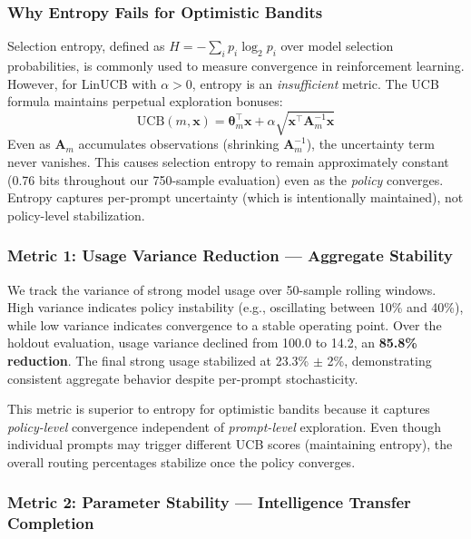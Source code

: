 \subsubsection{Why Entropy Fails for Optimistic Bandits}

Selection entropy, defined as $H = -\sum_i p_i \log_2 p_i$ over model selection probabilities, is commonly used to measure convergence in reinforcement learning. However, for LinUCB with $\alpha > 0$, entropy is an \emph{insufficient} metric. The UCB formula maintains perpetual exploration bonuses:
\begin{equation}
\text{UCB}(m, \mathbf{x}) = \boldsymbol{\theta}_m^\top \mathbf{x} + \alpha \sqrt{\mathbf{x}^\top \mathbf{A}_m^{-1} \mathbf{x}}
\end{equation}
Even as $\mathbf{A}_m$ accumulates observations (shrinking $\mathbf{A}_m^{-1}$), the uncertainty term never vanishes. This causes selection entropy to remain approximately constant (0.76 bits throughout our 750-sample evaluation) even as the \emph{policy} converges. Entropy captures per-prompt uncertainty (which is intentionally maintained), not policy-level stabilization.

\subsubsection{Metric 1: Usage Variance Reduction — Aggregate Stability}

We track the variance of strong model usage over 50-sample rolling windows. High variance indicates policy instability (e.g., oscillating between 10\% and 40\%), while low variance indicates convergence to a stable operating point. Over the holdout evaluation, usage variance declined from 100.0 to 14.2, an \textbf{85.8\% reduction}. The final strong usage stabilized at 23.3\% $\pm$ 2\%, demonstrating consistent aggregate behavior despite per-prompt stochasticity.

This metric is superior to entropy for optimistic bandits because it captures \emph{policy-level} convergence independent of \emph{prompt-level} exploration. Even though individual prompts may trigger different UCB scores (maintaining entropy), the overall routing percentages stabilize once the policy converges.

\subsubsection{Metric 2: Parameter Stability — Intelligence Transfer Completion}

